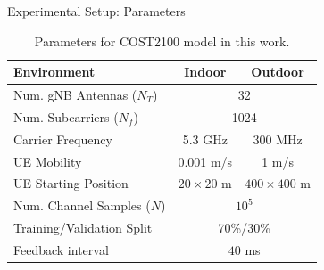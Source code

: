 \documentclass{beamer}
\begin{document}

  \begin{frame}{Experimental Setup: Parameters}
    \begin{table}[htb]
      \begin{center}
        \caption{Parameters for COST2100 model in this work.}
        \label{tab:cost2100-params} 
        \begin{tabular}{|l|c|c|}
          \hline 
          \textbf{Environment}      & \textbf{Indoor}  & \textbf{Outdoor} \\ \hline
          Num. gNB Antennas ($N_T$) & \multicolumn{2}{c|}{32} \\ \hline
          Num. Subcarriers ($N_f$)  & \multicolumn{2}{c|}{1024} \\ \hline
          Carrier Frequency         & 5.3 GHz            & 300 MHz \\ \hline
          UE Mobility               & 0.001 m/s        & 1 m/s \\ \hline
          UE Starting Position      & $20 \times 20$ m & $400 \times 400$ m \\ \hline
          Num. Channel Samples ($N$)& \multicolumn{2}{c|}{$10^5$} \\ \hline
          Training/Validation Split & \multicolumn{2}{c|}{70\%/30\%} \\ \hline
          Feedback interval         & \multicolumn{2}{c|}{$40$ ms} \\ \hline
        \end{tabular}
      \end{center}
    \end{table}
  \end{frame}

\end{document}

